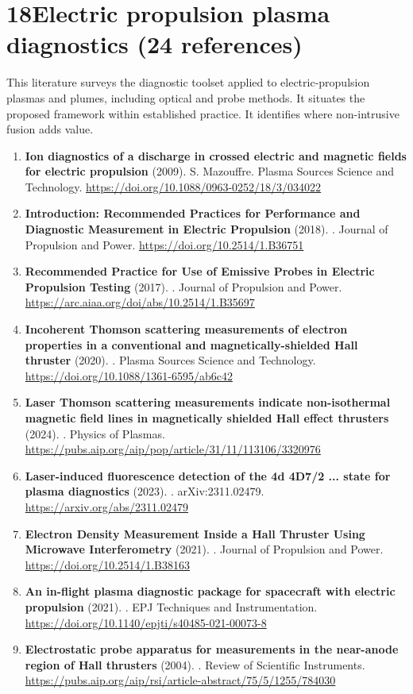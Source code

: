 \documentclass[11pt,a4paper]{article}
\begin{document}
\section*{18\quad Electric propulsion plasma diagnostics \textnormal{(\normalsize 24 references)}}
This literature surveys the diagnostic toolset applied to electric-propulsion plasmas and plumes, including optical and probe methods. It situates the proposed framework within established practice. It identifies where non-intrusive fusion adds value.
\begin{enumerate}[leftmargin=1.4em]
\item \textbf{Ion diagnostics of a discharge in crossed electric and magnetic fields for electric propulsion} (2009). S. Mazouffre. Plasma Sources Science and Technology. \url{https://doi.org/10.1088/0963-0252/18/3/034022}
\item \textbf{Introduction: Recommended Practices for Performance and Diagnostic Measurement in Electric Propulsion} (2018). . Journal of Propulsion and Power. \url{https://doi.org/10.2514/1.B36751}
\item \textbf{Recommended Practice for Use of Emissive Probes in Electric Propulsion Testing} (2017). . Journal of Propulsion and Power. \url{https://arc.aiaa.org/doi/abs/10.2514/1.B35697}
\item \textbf{Incoherent Thomson scattering measurements of electron properties in a conventional and magnetically-shielded Hall thruster} (2020). . Plasma Sources Science and Technology. \url{https://doi.org/10.1088/1361-6595/ab6c42}
\item \textbf{Laser Thomson scattering measurements indicate non-isothermal magnetic field lines in magnetically shielded Hall effect thrusters} (2024). . Physics of Plasmas. \url{https://pubs.aip.org/aip/pop/article/31/11/113106/3320976}
\item \textbf{Laser-induced fluorescence detection of the 4d 4D7/2 ... state for plasma diagnostics} (2023). . arXiv:2311.02479. \url{https://arxiv.org/abs/2311.02479}
\item \textbf{Electron Density Measurement Inside a Hall Thruster Using Microwave Interferometry} (2021). . Journal of Propulsion and Power. \url{https://doi.org/10.2514/1.B38163}
\item \textbf{An in-flight plasma diagnostic package for spacecraft with electric propulsion} (2021). . EPJ Techniques and Instrumentation. \url{https://doi.org/10.1140/epjti/s40485-021-00073-8}
\item \textbf{Electrostatic probe apparatus for measurements in the near-anode region of Hall thrusters} (2004). . Review of Scientific Instruments. \url{https://pubs.aip.org/aip/rsi/article-abstract/75/5/1255/784030}

\end{enumerate}
\end{document}
